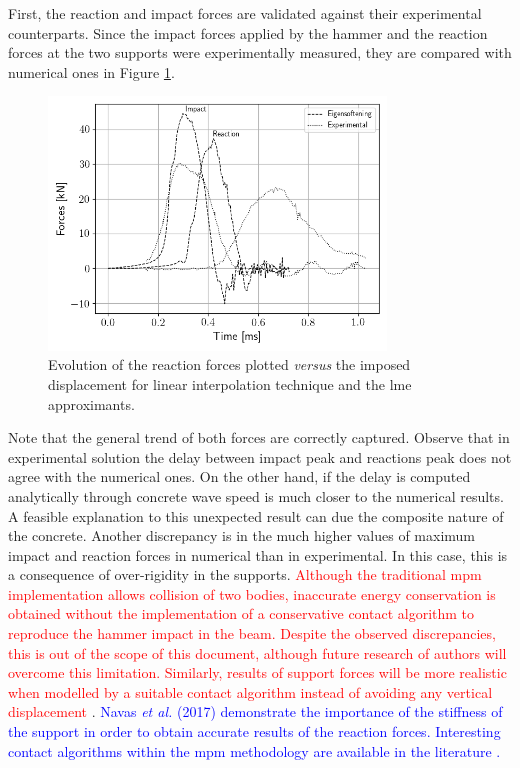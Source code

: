 \documentclass[preprint,12pt,a4paper]{elsarticle}
\newcommand{\PNA}[1]{
  \textcolor{red}{{#1}}
}
\newcommand{\MMP}[1]{
  \textcolor{blue}{{#1}}
}
\begin{document}
First, the reaction and impact forces are validated against their
experimental counterparts. Since the impact forces applied by the
hammer and the reaction forces at the two supports were experimentally
measured, they are compared with numerical ones in Figure
\ref{fig:Reactions-Forces-impact-test}. 
\begin{figure}
  \centering
  \includegraphics[width=0.8\textwidth]{Figure-impact-test-Forces-Time}
  \caption{Evolution of the reaction forces plotted \textit{versus}
    the imposed displacement for linear interpolation technique and
    the \acrshort{lme} approximants.}
  \label{fig:Reactions-Forces-impact-test}
\end{figure}
Note that the general trend of both forces are correctly
captured. Observe that in experimental solution the delay between
impact peak and reactions peak does not agree with the numerical
ones. On the other hand, if the delay is computed analytically through
concrete wave speed is much closer to the numerical results. A
feasible explanation to this unexpected result can due the composite
nature of the concrete. Another discrepancy is in the much higher
values of maximum impact and reaction forces in numerical than in
experimental. In this case, this is a consequence of over-rigidity
in the supports. \PNA{Although the traditional \acrshort{mpm} implementation allows collision of two bodies, inaccurate energy conservation is obtained without the implementation of a conservative contact algorithm to reproduce the hammer impact in the beam.
Despite the observed discrepancies, this is out of the scope of this
document, although future research of authors will overcome this
limitation. Similarly, results of support forces will be more
realistic when modelled by a suitable contact algorithm instead of
avoiding any vertical displacement}.\MMP{Navas {\it et al.}
(2017)\cite{Navas_2017_ES} demonstrate the importance of the stiffness
of the support in order to obtain accurate results of the reaction
forces. Interesting contact algorithms within the \acrshort{mpm}
methodology are available in the literature
\cite{Bardenhagen_Contact_2001,XZhang_Contact_2011}.}
\end{document}
